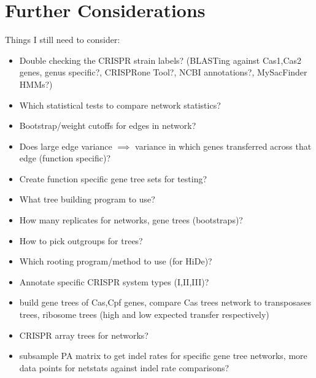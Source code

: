 \documentclass[12pt,letter]{article}
\begin{document}
\section*{Further Considerations}
Things I still need to consider:
\begin{itemize}
    \item Double checking the CRISPR strain labels? (BLASTing against Cas1,Cas2 genes, genus specific?, CRISPRone Tool?, NCBI annotations?, MySacFinder HMMs?)
    \item Which statistical tests to compare network statistics?
    \item Bootstrap/weight cutoffs for edges in network?
    \item Does large edge variance $\implies$ variance in which genes transferred across that edge (function specific)?
    \item Create function specific gene tree sets for testing?
    \item What tree building program to use?
    \item How many replicates for networks, gene trees (bootstraps)?
    \item How to pick outgroups for trees?
    \item Which rooting program/method to use (for HiDe)?
    \item Annotate specific CRISPR system types (I,II,III)?
    \item build gene trees of Cas,Cpf genes, compare Cas trees network to transposases trees, ribosome trees (high and low expected transfer respectively)
    \item CRISPR array trees for networks?
    \item subsample PA matrix to get indel rates for specific gene tree networks, more data points for netstats against indel rate comparisons?
\end{itemize}
\end{document}
